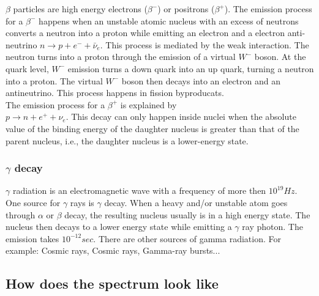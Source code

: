 \documentclass[]{article}
\begin{document}
$\beta$ particles are high energy electrons ($\beta^-$) or positrons ($\beta^+$). 
The emission process for a $\beta^-$ happens when an unstable atomic nucleus with an excess of neutrons converts a neutron into a proton while emitting an electron and a electron anti-neutrino $n\rightarrow p+e^-+\bar{\nu}_e$. This process is mediated by the weak interaction. The neutron turns into a proton through the emission of a virtual $W^-$ boson. At the quark level, $W^-$ emission turns a down quark into an up quark, turning a neutron into a proton. The virtual $W^-$ boson then decays into an electron and an antineutrino. This process happens in fission byproducats.\\
The emission process for a $\beta^+$ is explained by\\
$p\rightarrow n+e^++\nu_e$. This decay can only happen inside nuclei when the absolute value of the binding energy of the daughter nucleus is greater than that of the parent nucleus, i.e., the daughter nucleus is a lower-energy state.

\subsubsection{$\gamma$ decay}

$\gamma$ radiation is an electromagnetic wave with a frequency of more then $10^{19}Hz$.
One source for $\gamma$ rays is $\gamma$ decay. When a heavy and/or unstable atom goes through $\alpha$ or $\beta$ decay, the resulting nucleus usually is in a high energy state. The nucleus then decays to a lower energy state while emitting a $\gamma$ ray photon. The emission takes $10^{-12}sec$.
There are other sources of gamma radiation. For example: Cosmic rays, Cosmic rays, Gamma-ray bursts...

\subsection{How does the spectrum look like}
\end{document}

